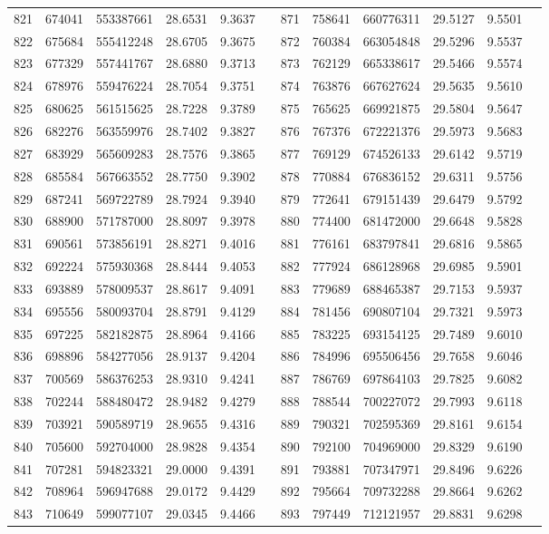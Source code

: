 \begin{longtable}{SSSSSSSSSSSS}
821&674041&553387661&28.6531&9.3637&&871&758641&660776311&29.5127&9.5501\\
822&675684&555412248&28.6705&9.3675&&872&760384&663054848&29.5296&9.5537\\
823&677329&557441767&28.6880&9.3713&&873&762129&665338617&29.5466&9.5574\\
824&678976&559476224&28.7054&9.3751&&874&763876&667627624&29.5635&9.5610\\
825&680625&561515625&28.7228&9.3789&&875&765625&669921875&29.5804&9.5647\\
826&682276&563559976&28.7402&9.3827&&876&767376&672221376&29.5973&9.5683\\
827&683929&565609283&28.7576&9.3865&&877&769129&674526133&29.6142&9.5719\\
828&685584&567663552&28.7750&9.3902&&878&770884&676836152&29.6311&9.5756\\
829&687241&569722789&28.7924&9.3940&&879&772641&679151439&29.6479&9.5792\\
830&688900&571787000&28.8097&9.3978&&880&774400&681472000&29.6648&9.5828\\
831&690561&573856191&28.8271&9.4016&&881&776161&683797841&29.6816&9.5865\\
832&692224&575930368&28.8444&9.4053&&882&777924&686128968&29.6985&9.5901\\
833&693889&578009537&28.8617&9.4091&&883&779689&688465387&29.7153&9.5937\\
834&695556&580093704&28.8791&9.4129&&884&781456&690807104&29.7321&9.5973\\
835&697225&582182875&28.8964&9.4166&&885&783225&693154125&29.7489&9.6010\\
836&698896&584277056&28.9137&9.4204&&886&784996&695506456&29.7658&9.6046\\
837&700569&586376253&28.9310&9.4241&&887&786769&697864103&29.7825&9.6082\\
838&702244&588480472&28.9482&9.4279&&888&788544&700227072&29.7993&9.6118\\
839&703921&590589719&28.9655&9.4316&&889&790321&702595369&29.8161&9.6154\\
840&705600&592704000&28.9828&9.4354&&890&792100&704969000&29.8329&9.6190\\
841&707281&594823321&29.0000&9.4391&&891&793881&707347971&29.8496&9.6226\\
842&708964&596947688&29.0172&9.4429&&892&795664&709732288&29.8664&9.6262\\
843&710649&599077107&29.0345&9.4466&&893&797449&712121957&29.8831&9.6298\\

\end{longtable}
